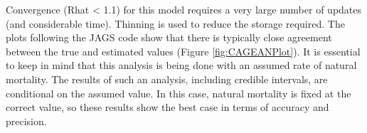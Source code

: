 \documentclass[
]{krantz}
\makeatletter
\newenvironment{Shaded}{\begin{snugshade}}{\end{snugshade}}
\newcommand{\AttributeTok}[1]{\textcolor[rgb]{0.27,0.27,0.27}{#1}}
\newcommand{\DecValTok}[1]{\textcolor[rgb]{0.06,0.06,0.06}{#1}}
\newcommand{\FunctionTok}[1]{\textcolor[rgb]{0.27,0.27,0.27}{\textbf{#1}}}
\newcommand{\NormalTok}[1]{#1}
\newcommand{\SpecialCharTok}[1]{\textcolor[rgb]{0.43,0.43,0.43}{\textbf{#1}}}
\newcommand{\StringTok}[1]{\textcolor[rgb]{0.5,0.5,0.5}{#1}}
\newenvironment{kframe}{%
\medskip{}
\setlength{\fboxsep}{.8em}
 \def\at@end@of@kframe{}%
 \ifinner\ifhmode%
  \def\at@end@of@kframe{\end{minipage}}%
  \begin{minipage}{\columnwidth}%
 \fi\fi%
 \def\FrameCommand##1{\hskip\@totalleftmargin \hskip-\fboxsep
 \colorbox{shadecolor}{##1}\hskip-\fboxsep
     \hskip-\linewidth \hskip-\@totalleftmargin \hskip\columnwidth}%
 \MakeFramed {\advance\hsize-\width
   \@totalleftmargin\z@ \linewidth\hsize
   \@setminipage}}%
 {\par\unskip\endMakeFramed%
 \at@end@of@kframe}
\renewenvironment{Shaded}{\begin{kframe}}{\end{kframe}}
\makeatother
\begin{document}
\begin{Shaded}
\end{Shaded}

Convergence (Rhat \textless{} 1.1) for this model requires a very large number of updates (and considerable time). Thinning is used to reduce the storage required. The plots following the JAGS code show that there is typically close agreement between the true and estimated values (Figure \ref{fig:CAGEANPlot}). It is essential to keep in mind that this analysis is being done with an assumed rate of natural mortality. The results of such an analysis, including credible intervals, are conditional on the assumed value. In this case, natural mortality is fixed at the correct value, so these results show the best case in terms of accuracy and precision.
\end{document}
